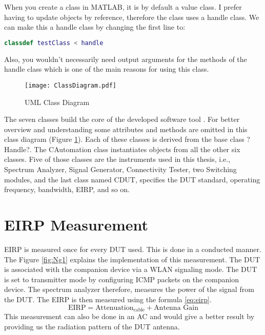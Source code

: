 When you create a class in MATLAB\textregistered{}, it is by default a value class. I prefer having to update objects by reference, therefore the class uses a handle class. We can make this a handle class by changing the first line to:
\begin{lstlisting}[language=MATLAB]
classdef testClass < handle
\end{lstlisting}
Also, you wouldn't necessarily need output arguments for the methods of the handle class which is one of the main reasons for using this class. 

\begin{figure}[H]
\centering
\texttt{[image: ClassDiagram.pdf]}
\caption{UML Class Diagram}
\label{fig:cd} 
\end{figure}

The seven classes build the core of the developed software tool . For better overview and understanding some attributes and methods are omitted in this class diagram (Figure \ref{fig:cd}). Each of these classes is derived from the base class ?Handle?. The CAutomation class instantiates objects from all the other six classes. Five of those classes are the instruments used in this thesis, i.e., Spectrum Analyzer, Signal Generator, Connectivity Tester, two Switching modules, and the last class named CDUT, specifies the \acs{DUT} standard, operating frequency, bandwidth, \acs{EIRP}, and so on.

\section{\acs{EIRP} Measurement}
\acs{EIRP} is measured once for every \acs{DUT} used. This is done in a conducted manner. The Figure \ref{fig:Ng1} explains the implementation of this measurement. The \acs{DUT} is associated with the companion device via a \acs{WLAN} signaling mode. The \acs{DUT} is set to transmitter mode by configuring \acs{ICMP} packets on the companion device. The spectrum analyzer therefore, measures the power of the signal from the \acs{DUT}. The \acs{EIRP} is then measured using the formula \ref{eq:eirp}.
\begin{equation}
\mbox{EIRP}  = \mbox{Attenuation}_{\mbox{cable}} +\mbox{Antenna Gain} \label{eq:eirp}
\end{equation}
This measurement can also be done in an \acf{AC} and would give a better result by providing us the radiation pattern of the \acs{DUT} antenna.


